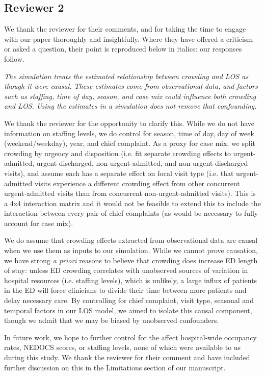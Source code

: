 \subsection{Reviewer 2}

We thank the reviewer for their comments, and for taking the time to engage with our paper thoroughly and insightfully. Where they have offered a criticism or asked a question, their point is reproduced below in italics: our responses follow.


\textit{     The simulation treats the estimated relationship between crowding and LOS as though it were causal. These estimates come from observational data, and factors such as staffing, time of day, season, and case mix could influence both crowding and LOS. Using the estimates in a simulation does not remove that confounding.}

We thank the reviewer for the opportunity to clarify this. While we do not have information on staffing levels, we do control for season, time of day, day of week (weekend/weekday), year, and chief complaint. As a proxy for case mix, we split crowding by urgency and disposition (i.e. fit separate crowding effects to urgent-admitted, urgent-discharged, non-urgent-admitted, and non-urgent-discharged visits), and assume each has a separate effect on focal visit type (i.e. that urgent-admitted visits experience a different crowding effect from other concurrent urgent-admitted visits than from concurrent non-urgent-admitted visits). This is a 4x4 interaction matrix and it would not be feasible to extend this to include the interaction between every pair of chief complaints (as would be necessary to fully account for case mix).

We do assume that crowding effects extracted from observational data are causal when we use them as inputs to our simulation. While we cannot prove causation, we have strong \textit{a priori} reasons to believe that crowding does increase ED length of stay: unless ED crowding correlates with unobserved sources of variation in hospital resources (i.e. staffing levels), which is unlikely, a large influx of patients in the ED will force clinicians to divide their time between more patients and delay necessary care. By controlling for chief complaint, visit type, seasonal and temporal factors in our LOS model, we aimed to isolate this causal component, though we admit that we may be biased by unobserved confounders.

In future work, we hope to further control for the affect hospital-wide occupancy rates, NEDOCS scores, or staffing levels, none of which were available to us during this study. We thank the reviewer for their comment and have included further discussion on this in the Limitations section of our manuscript.

